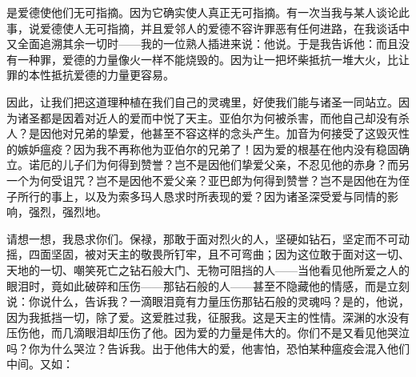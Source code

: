 是爱德使他们无可指摘。因为它确实使人真正无可指摘。有一次当我与某人谈论此事，说爱德使人无可指摘，并且爱邻人的爱德不容许罪恶有任何进路，在我谈话中又全面追溯其余一切时——我的一位熟人插进来说：他说。于是我告诉他：而且没有一种罪，爱德的力量像火一样不能烧毁的。因为让一把坏柴抵抗一堆大火，比让罪的本性抵抗爱德的力量更容易。\par

因此，让我们把这道理种植在我们自己的灵魂里，好使我们能与诸圣一同站立。因为诸圣都是因着对近人的爱而中悦了天主。亚伯尔为何被杀害，而他自己却没有杀人？是因他对兄弟的挚爱，他甚至不容这样的念头产生。加音为何接受了这毁灭性的嫉妒瘟疫？因为我不再称他为亚伯尔的兄弟了！因为爱的根基在他内没有稳固确立。诺厄的儿子们为何得到赞誉？岂不是因他们挚爱父亲，不忍见他的赤身？而另一个为何受诅咒？岂不是因他不爱父亲？亚巴郎为何得到赞誉？岂不是因他在为侄子所行的事上，以及为索多玛人恳求时所表现的爱？因为诸圣深受爱与同情的影响，强烈，强烈地。\par

请想一想，我恳求你们。保禄，那敢于面对烈火的人，坚硬如钻石，坚定而不可动摇，四面坚固，被对天主的敬畏所钉牢，且不可弯曲；因为这位敢于面对这一切、天地的一切、嘲笑死亡之钻石般大门、无物可阻挡的人——当他看见他所爱之人的眼泪时，竟如此破碎和压伤——那钻石般的人——甚至不隐藏他的情感，而是立刻说：你说什么，告诉我？一滴眼泪竟有力量压伤那钻石般的灵魂吗？是的，他说，因为我抵挡一切，除了爱。这爱胜过我，征服我。这是天主的性情。深渊的水没有压伤他，而几滴眼泪却压伤了他。因为爱的力量是伟大的。你们不是又看见他哭泣吗？你为什么哭泣？告诉我。出于他伟大的爱，他害怕，恐怕某种瘟疫会混入他们中间。又如：\par

